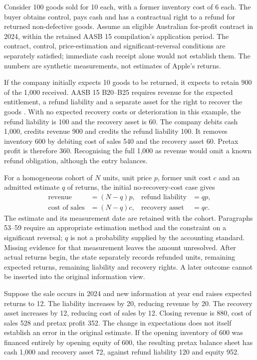 Consider 100 goods sold for 10 each, with a former inventory cost of 6 each.
The buyer obtains control, pays cash and has a contractual right to a refund
for returned non-defective goods. Assume an eligible Australian for-profit
contract in 2024, within the retained AASB 15 compilation's application period.
The contract, control, price-estimation and significant-reversal conditions
are separately satisfied; immediate cash receipt alone would not establish
them. The numbers are synthetic measurements, not estimates of Apple's returns.

If the company initially expects 10 goods to be returned, it expects to retain
900 of the 1,000 received. AASB 15 B20--B25 requires revenue for the expected
entitlement, a refund liability and a separate asset for the right to recover
the goods \citep{aasb15dated}. With no expected recovery costs or deterioration
in this example, the refund liability is 100 and the recovery asset is 60.
The company debits cash 1,000, credits revenue 900 and credits the refund
liability 100. It removes inventory 600 by debiting cost of sales 540 and the
recovery asset 60. Pretax profit is therefore 360. Recognising the full 1,000
as revenue would omit a known refund obligation, although the entry balances.

For a homogeneous cohort of $N$ units, unit price $p$, former unit cost $c$ and
an admitted estimate $q$ of returns, the initial no-recovery-cost case gives
\begin{align*}
 \text{revenue}&=(N-q)p, & \text{refund liability}&=qp,\\
 \text{cost of sales}&=(N-q)c, & \text{recovery asset}&=qc.
\end{align*}
The estimate and its measurement date are retained with the cohort. Paragraphs
53--59 require an appropriate estimation method and the constraint on a
significant reversal; $q$ is not a probability supplied by the accounting
standard. Missing evidence for that measurement leaves the amount unresolved.
After actual returns begin, the state separately records refunded units,
remaining expected returns, remaining liability and recovery rights. A later
outcome cannot be inserted into the original information view.

Suppose the sale occurs in 2024 and new information at year end raises expected
returns to 12. The liability increases by 20, reducing revenue by 20. The
recovery asset increases by 12, reducing cost of sales by 12. Closing revenue
is 880, cost of sales 528 and pretax profit 352. The change in expectations
does not itself establish an error in the original estimate. If the opening
inventory of 600 was financed entirely by opening equity of 600, the resulting
pretax balance sheet has cash 1,000 and recovery asset 72, against refund
liability 120 and equity 952.

